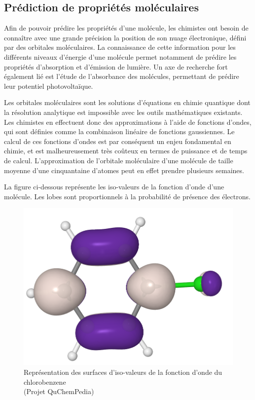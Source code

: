 \subsection{Prédiction de propriétés moléculaires}

\par Afin de pouvoir prédire les propriétés d'une molécule, les chimistes ont besoin de connaître avec une grande précision la position de son nuage électronique, défini par des orbitales moléculaires. La connaissance de cette information pour les différents niveaux d'énergie d'une molécule permet notamment de prédire les propriétés d'absorption et d'émission de lumière. Un axe de recherche fort également lié est l'étude de l'absorbance des molécules, permettant de prédire leur potentiel photovoltaïque.\\

\par Les orbitales moléculaires sont les solutions d'équations en chimie quantique dont la résolution analytique est impossible avec les outils mathématiques existants. Les chimistes en effectuent donc des approximations à l'aide de fonctions d'ondes, qui sont définies comme la combinaison linéaire de fonctions gaussiennes. Le calcul de ces fonctions d'ondes est par conséquent un enjeu fondamental en chimie, et est malheureusement très coûteux en termes de puissance et de temps de calcul. L'approximation de l'orbitale  moléculaire d'une molécule de taille moyenne d'une cinquantaine d'atomes peut en effet prendre plusieurs semaines.\\

\par La figure ci-dessous représente les iso-valeurs de la fonction d'onde d'une molécule. Les lobes sont proportionnels à la probabilité de présence des électrons.

\begin{figure}[!h]
	\centering
	\includegraphics[scale=0.25]{images/iso_niveaux.png}
	\caption{Représentation des surfaces d'iso-valeurs de la fonction d'onde du chlorobenzene\\ (Projet QuChemPedia)}
\end{figure}


